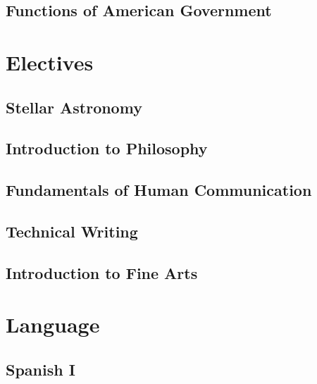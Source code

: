 \documentclass[11pt]{book}
\begin{document}
\chapter{Functions of American Government}

\part{Electives}
\chapter{Stellar Astronomy}
\chapter{Introduction to Philosophy}
\chapter{Fundamentals of Human Communication}
\chapter{Technical Writing}
\chapter{Introduction to Fine Arts}



\part{Language}
\chapter{Spanish I}
\end{document}
